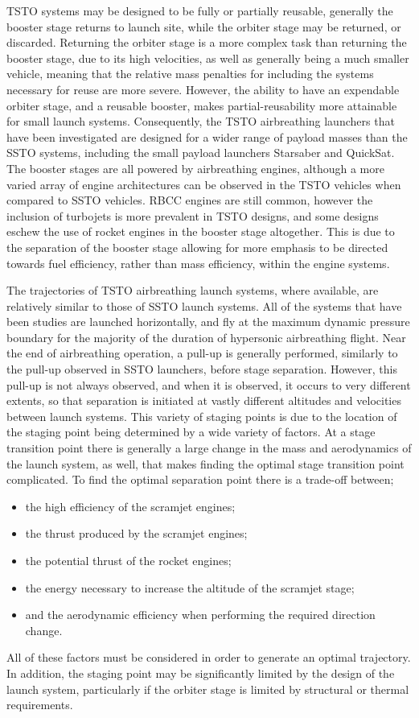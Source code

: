 TSTO systems may be designed to be fully or partially reusable, generally the booster stage returns to launch site, while the orbiter stage may be returned, or discarded. Returning the orbiter stage is a more complex task than returning the booster stage, due to its high velocities, as well as generally being a much smaller vehicle, meaning that the relative mass penalties for including the systems necessary for reuse are more severe. However, the ability to have an expendable orbiter stage, and a reusable booster, makes partial-reusability more attainable for small launch systems. 
Consequently, the TSTO airbreathing launchers that have been investigated are designed for a wider range of payload masses than the SSTO systems, including the small payload launchers Starsaber and QuickSat. The booster stages are all powered by airbreathing engines, although a more varied array of engine architectures can be observed in the TSTO vehicles when compared to SSTO vehicles. RBCC engines are still common, however the inclusion of turbojets is more prevalent in TSTO designs, and some designs eschew the use of rocket engines in the booster stage altogether. This is due to the separation of the booster stage allowing for more emphasis to be directed towards fuel efficiency, rather than mass efficiency, within the engine systems. 

The trajectories of TSTO airbreathing launch systems, where available, are relatively similar to those of SSTO launch systems. All of the systems that have been studies are launched horizontally, and fly at the maximum dynamic pressure boundary for the majority of the duration of hypersonic airbreathing flight. Near the end of airbreathing operation, a pull-up is generally performed, similarly to the pull-up observed in SSTO launchers, before stage separation. However, this pull-up is not always observed, and when it is observed, it occurs to very different extents, so that separation is initiated at vastly different altitudes and velocities between launch systems. 
This variety of staging points is due to the location of the staging point being determined by a wide variety of factors. At a stage transition point there is generally a large change in the mass and aerodynamics of the launch system, as well, that makes finding the optimal stage transition point complicated. To find the optimal separation point there is a trade-off between;
\begin{itemize}
	\item the high efficiency of the scramjet engines;
	\item the thrust produced by the scramjet engines;
	\item the potential thrust of the rocket engines;
	\item the energy necessary to increase the altitude of the scramjet stage;
	\item and the aerodynamic efficiency when performing the required direction change.
\end{itemize}
All of these factors must be considered in order to generate an optimal trajectory. In addition, the staging point may be significantly limited by the design of the launch system, particularly if the orbiter stage is limited by structural or thermal requirements. 

